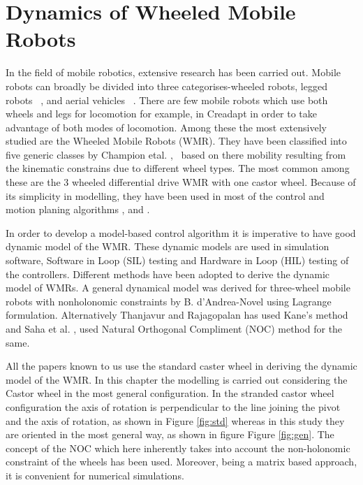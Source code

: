 \chapter{Dynamics of Wheeled Mobile Robots }
\label{c4_Dynamics}
In the field of mobile robotics, extensive research has been carried out. 
Mobile robots can broadly be divided into three categorises-wheeled robots, legged robots ~\cite{machado2006overview}, and aerial vehicles ~\cite{valavanis2014handbook}. 
There are few mobile robots which use both wheels and legs for locomotion for example, in Creadapt  \cite{mouret2015evolutionary} in order to take advantage of both modes of locomotion. 
Among these the most extensively studied are the  Wheeled Mobile Robots (WMR). 
They have been classified into five generic classes by Champion etal. \cite{campion1996structural},~\cite{campion2008wheeled}  based on there mobility resulting from the kinematic constrains due to  different wheel types.
 The most common among these are the  3 wheeled differential drive WMR with one castor wheel.
  Because of its simplicity in modelling, they have been used in most of the  control and motion planing algorithms  \cite{desantis1995modeling}, \cite{koh1999smooth} and \cite{d1995control}. 

In order to develop a model-based control algorithm it is imperative to have good dynamic model of the WMR.
 These dynamic models are used in  simulation software,  Software in Loop (SIL) testing and Hardware in Loop (HIL) testing  of the controllers.
 Different methods have  been adopted to derive the dynamic model of WMRs.
  A general dynamical model was derived for three-wheel mobile robots with nonholonomic constraints  by B. d'Andrea-Novel \cite{d1991modelling} using  Lagrange formulation.
    Alternatively Thanjavur and Rajagopalan \cite{thanjavur1997ease} has used Kane's method  and  Saha et al. \cite{saha1991dynamics},\cite{saha1989kinematics} used Natural Orthogonal Compliment (NOC) method for the same.  
 
All the papers known to us use the standard caster wheel in deriving the dynamic model of the WMR. In this chapter the modelling is carried out considering the Castor wheel in the most general configuration.
 In the stranded castor wheel configuration the axis of rotation is perpendicular to the line joining the pivot and the axis of rotation, as shown in Figure \ref{fig:std} whereas in this study they are oriented in  the most general way, as shown in figure Figure \ref{fig:gen}. 
 The concept of the NOC which here inherently takes into account the non-holonomic constraint of the wheels has been used.
  Moreover, being a matrix based approach, it is convenient for numerical simulations. 
